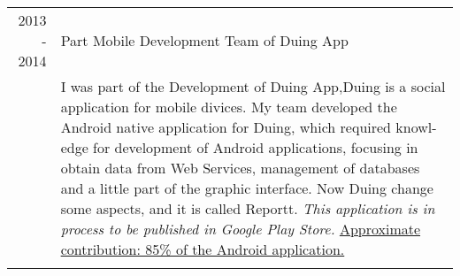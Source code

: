 \documentclass[a4paper,10pt]{article} %
\begin{document}
\begin{tabular}{r|p{11cm}}

\textsc{2013 - 2014} & Part Mobile Development Team of Duing App\\
& \footnotesize{I was part of the Development of Duing App,Duing is a social application for mobile divices.
My team developed the Android native application for Duing, which required knowl-
edge for development of Android applications, focusing in obtain data from Web Services, management of databases
and a little part of the graphic interface. Now Duing change some aspects, and it is called Reportt. \textit{This application is in process to be published in Google Play Store.} \underline{Approximate contribution: 85\% of the Android application.}}\\
\multicolumn{2}{c}{} \\
\end{tabular}

\end{document}
